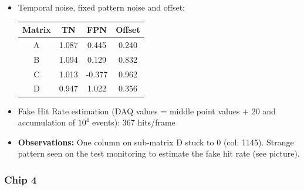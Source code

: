 \documentclass[a4papper, 10pt]{article}
\begin{document}
\begin{itemize}
          \item Temporal noise, fixed pattern noise and offset:

            \begin{center}
              \begin{tabular}{|c|c|c|c|}
                \hline %
         \rowcolor{light-gray}         Matrix  &  TN   &  FPN  &  Offset  \tabularnewline
                \hline %
                    A     & 1.087 & 0.445 & 0.240    \tabularnewline
                \hline %
                    B     & 1.094 &  0.129 & 0.832   \tabularnewline
                \hline %
                    C     & 1.013 & -0.377 & 0.962   \tabularnewline
                \hline %
                    D     & 0.947 & 1.022 & 0.356    \tabularnewline
                \hline %
              \end{tabular}
            \end{center}

        \item Fake Hit Rate estimation (DAQ values = middle point values + 20 and accumulation of $10^4$ events): 367 hits/frame
        
        \item \textbf{Observations:} One column on sub-matrix D stuck to 0 (col: 1145). Strange pattern seen on the test monitoring to estimate the fake hit rate (see picture).
        
        \end{itemize}

      \subsubsection{Chip 4}
\end{document}
